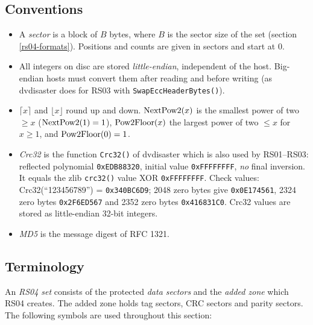 \subsection{Conventions}
\label{rs04-conventions}

\begin{itemize}
\item A {\em sector} is a block of $B$ bytes, where $B$ is the sector size of
  the set (section \ref{rs04-formats}). Positions and counts are given in
  sectors and start at 0.
\item All integers on disc are stored {\em little-endian}, independent of the
  host. Big-endian hosts must convert them after reading and before writing
  (as dvdisaster does for RS03 with {\tt SwapEccHeaderBytes()}).
\item $\lceil x \rceil$ and $\lfloor x \rfloor$ round up and down.
  ${\rm NextPow2}(x)$ is the smallest power of two $\ge x$
  (${\rm NextPow2}(1)=1$), ${\rm Pow2Floor}(x)$ the largest power of two
  $\le x$ for $x \ge 1$, and ${\rm Pow2Floor}(0)=1$.
\item {\em Crc32} is the function {\tt Crc32()} of dvdisaster which is also
  used by RS01--RS03: reflected polynomial {\tt 0xEDB88320}, initial value
  {\tt 0xFFFFFFFF}, {\em no} final inversion. It equals the zlib
  {\tt crc32()} value XOR {\tt 0xFFFFFFFF}. Check values:
  Crc32(``123456789'') = {\tt 0x340BC6D9}; 2048 zero bytes give
  {\tt 0x0E174561}, 2324 zero bytes {\tt 0x2F6ED567} and 2352 zero bytes
  {\tt 0x416831C0}. Crc32 values are stored as little-endian 32-bit integers.
\item {\em MD5} is the message digest of RFC 1321.
\end{itemize}

\subsection{Terminology}
\label{rs04-terms}

An {\em RS04 set} consists of the protected {\em data sectors} and the
{\em added zone} which RS04 creates. The added zone holds tag sectors, CRC
sectors and parity sectors. The following symbols are used throughout this
section:

